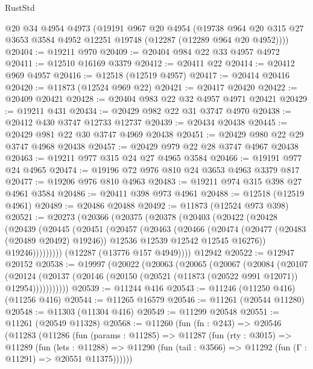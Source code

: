 \begin{lexlean}{RustStd}
\begin{coremodule}
    @20
    @34
    @4954
    @4973
    (@19191
      @967
      @20
      @4954
      (@19738 @964 @20 @315 @27 @3653 @3584 @4952 @12251 @19748 (@12287 (@12289 @964 @20 @4952))))
@20404 := @19211 @970
@20409 := @20404 @984 @22 @33 @4957 @4972
@20411 := @12510 @16169 @3379
@20412 := @20411 @22
@20414 := @20412 @969 @4957
@20416 := @12518 (@12519 @4957)
@20417 := @20414 @20416
@20420 := @11873 (@12524 @969 @22)
@20421 := @20417 @20420
@20422 := @20409 @20421
@20428 := @20404 @983 @22 @32 @4957 @4971 @20421
@20429 := @19211 @431
@20434 := @20429 @982 @22 @31 @3747 @4970
@20438 := @20412 @430 @3747 @12733 @12737
@20439 := @20434 @20438
@20445 := @20429 @981 @22 @30 @3747 @4969 @20438
@20451 := @20429 @980 @22 @29 @3747 @4968 @20438
@20457 := @20429 @979 @22 @28 @3747 @4967 @20438
@20463 := @19211 @977 @315 @24 @27 @4965 @3584
@20466 := @19191 @977 @24 @4965
@20474 := @19196 @72 @976 @810 @24 @3653 @4963 @3379 @817
@20477 := @19206 @976 @810 @4963
@20483 := @19211 @974 @315 @398 @27 @4961 @3584
@20486 := @20411 @398 @973 @4961
@20488 := @12518 (@12519 @4961)
@20489 := @20486 @20488
@20492 := @11873 (@12524 @973 @398)
@20521 := @20273
    (@20366
      (@20375
        (@20378
          (@20403
            (@20422
              (@20428
                (@20439
                  (@20445
                    (@20451
                      (@20457
                        (@20463
                          (@20466
                            (@20474
                              (@20477 (@20483 (@20489 @20492) @19246))
                              @12536
                              @12539
                              @12542
                              @12545
                              @16276))
                          @19246)))))))))
        (@12287 (@13776 @157 @4949))))
    @12942
@20522 := @12947 @20152
@20538 := @19997
    (@20022
      (@20063
        (@20065
          (@20067
            (@20084
              (@20107
                (@20124
                  (@20137 (@20146 (@20150 (@20521 (@11873 (@20522 @991 @12071)) @12954)))))))))))
@20539 := @11244 @416
@20543 := @11246 (@11250 @416) (@11256 @416)
@20544 := @11265 @16579
@20546 := @11261 (@20544 @11280)
@20548 := @11303 (@11304 @416)
@20549 := @11299 @20548
@20551 := @11261 (@20549 @11328)
@20568 := @11260
    (fun (fn : @243) =>
    @20546
      (@11283
        (@11286
          (fun (params : @11285) =>
          @11287
            (fun (rty : @3015) =>
            @11289
              (fun (lets : @11288) =>
              @11290 (fun (tail : @3566) => @11292 (fun (Γ : @11291) => @20551 @11375))))))

\end{coremodule}
\end{lexlean}
